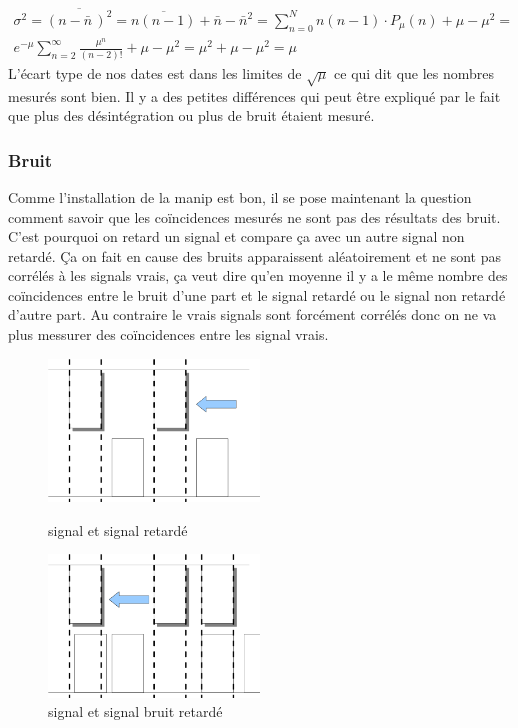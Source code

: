 \documentclass[a4paper,11pt,liststotocnumbered,bibtotocnumbered]{scrartcl}
\begin{document}
    \begin{equation*}
     \begin{split}
      \sigma^2=\overline{(n-\bar{n}\,)^2}=\overline{n(n-1)}+\bar{n}-{\bar{n}}^2=\sum_{n=0} ^{N} n (n-1)\cdot P_{\mu}(n)+\mu -\mu^2=\\
      e^{-{\mu}}\sum_{n=2}^{\infty}\frac{\mu^n}{(n-2)!}+\mu -\mu^2=\mu^2+ \mu -\mu^2=\mu
     \end{split}
    \end{equation*}
    L'écart type de nos dates est dans les limites de $\sqrt{\mu}$ ce qui dit que les nombres mesurés sont bien. Il y a des petites différences qui peut être expliqué par le fait que plus des désintégration ou plus de bruit étaient mesuré.
   \subsubsection{Bruit}
Comme l'installation de la manip est bon, il se pose maintenant la question comment
savoir que les coïncidences mesurés ne sont pas des résultats des bruit. C'est pourquoi on retard un signal et compare \c ca avec un autre signal non retardé. \c Ca on fait en cause des bruits apparaissent aléatoirement et ne sont pas corrélés à les signals vrais, \c ca veut dire qu'en moyenne il y a le même nombre des co\"{i}ncidences entre le bruit d'une part et le signal retardé ou le signal non retardé  d'autre part. Au  contraire le vrais signals sont forcément corrélés donc on ne va plus messurer des co\"{i}ncidences entre les signal vrais.
\begin{figure}[h]
   \begin{minipage}[H]{0.5\textwidth}
        \centering
	\includegraphics[width=0.5\textwidth]{bilder/retard.png}
        \caption{signal et signal retardé }
   \end{minipage}
   \hfill
   \begin{minipage}[H]{0.5\textwidth}
        \centering
       	\includegraphics[width=0.5\textwidth]{bilder/retard2.png}
        \caption{signal et signal bruit retardé}
   \end{minipage}
   \end{figure}
   \newline
\end{document}
